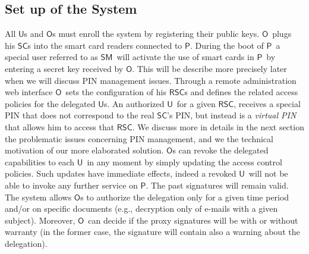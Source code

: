 \documentclass{sig-alternate}
\newcommand{\Owner}{\ensuremath{\mathsf{O}}}
\newcommand{\SM}{\ensuremath{\mathsf{SM}}}
\newcommand{\User}{\ensuremath{\mathsf{U}}}
\newcommand{\Proxy}{\ensuremath{\mathsf{P}}}
\newcommand{\SC}{\ensuremath{\mathsf{SC}}}
\newcommand{\RSC}{\ensuremath{\mathsf{RSC}}}
\begin{document}
\subsection{Set up of the System}
All \User s and \Owner s must enroll the system by registering their public keys. \Owner\ plugs his \SC s into the smart card readers connected to \Proxy. 
During the boot of \Proxy\ a special user referred to as \SM\ will activate the use of smart cards in \Proxy\ by 
entering a secret key received by \Owner. This will be describe more precisely later when we will discuss PIN management issues.
Through a remote administration web interface \Owner\ sets the configuration of his \RSC s and defines the related access policies for the delegated \User s.
An authorized \User\ for a given \RSC, receives a special PIN that does not correspond to the
real \SC 's PIN, but instead is a \emph{virtual PIN} that allows him to access  that \RSC. We discuss more in details in the next section the problematic issues concerning  PIN management, and we the technical motivation of our more elaborated solution. 
\Owner s can revoke the delegated capabilities to each
\User\ in any moment by simply updating the access control policies. Such updates have immediate effects, indeed a revoked \User\ will not be able to invoke any further service on \Proxy . The past signatures will remain valid. The system allows \Owner s to authorize the delegation only for a given time period and/or on specific documents (e.g., decryption only of e-mails with a given subject). Moreover, \Owner\ can decide if the proxy signatures will be with or without warranty (in the former case, the signature will contain also a warning about the delegation). 
\end{document}
